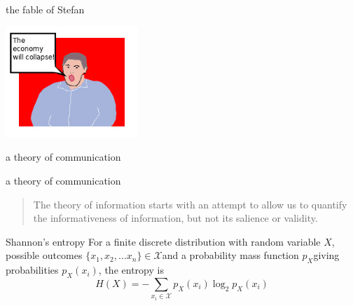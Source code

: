 \documentclass{beamer}
\newcommand{\crish}{\color{reddish}}
\newcommand{\cbla}{\color{black}}
\newcommand{\sm}{\color{reddish}$}
\newcommand{\fm}{$\color{black}}
\begin{document}
\begin{frame}{the fable of Stefan}
  \begin{center}
\includegraphics[width=5cm]{boring_man.jpg}
\end{center}
  \end{frame}


\begin{frame}{a theory of communication}
  \begin{center}
  \end{center}
\end{frame}

\begin{frame}{a theory of communication}
  \begin{quote}
    The theory of information starts with an attempt to allow us to
quantify the informativeness of information, but not its salience or
validity.
  \end{quote}
  \end{frame}

\begin{frame}{Shannon's entropy}
  For a finite discrete distribution with random variable \sm X\fm,
  possible outcomes \sm\{x_1,x_2,\ldots x_n\}\in\mathcal{X}\fm and a
  probability mass function \sm p_X\fm giving probabilities \sm p_X(x_i)\fm, the
  entropy is
\crish
  $$
H(X)=-\sum_{x_i\in \mathcal{X}}{p_X(x_i)\log_2p_X(x_i)}
  $$
\cbla
\end{frame}
\end{document}
